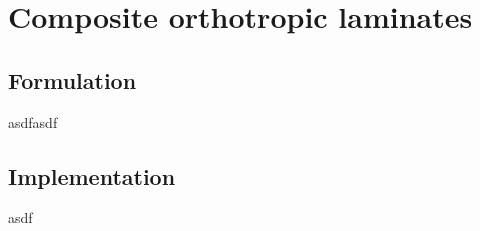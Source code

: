 



\chapter{Composite orthotropic laminates}
\label{chap:chapter_composite_formulation_implementation}

\renewcommand{\Thema}{Composite orthotropic laminates}

\section{Formulation}
asdfasdf
\newpage

\section{Implementation}
asdf
